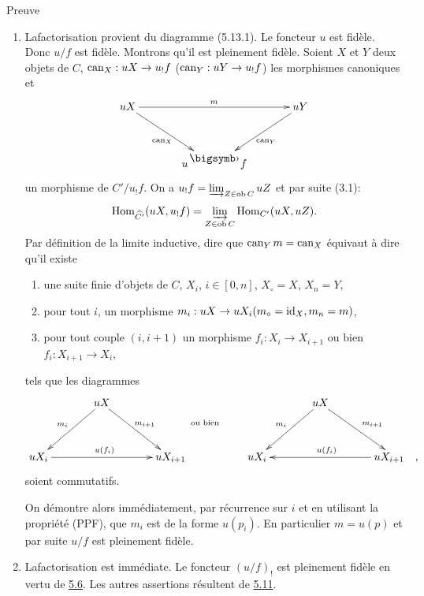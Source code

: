 \documentclass[10pt]{../fichiers-configuration-latex/smfart}
\def\labelenumi{(\theenumi)}
\def\labelenumii{(\theenumii)}
\begin{document}
\begin{enonce*}[remark]{Preuve}
\begin{enumerate}
\renewcommand{\labelenumi}{\theenumi)}
\item La\pageoriginale factorisation provient du diagramme
  (5.13.1). Le foncteur $u$ est fidèle. Donc $u/f$ est
  fidèle. Montrons qu'il est pleinement fidèle. Soient $X$ et $Y$
  deux objets de $C$, $\operatorname{can}_X:uX\rightarrow u_{!}f$
  (\resp  $\operatorname{can}_Y:uY\rightarrow u_{!}f$) les morphismes canoniques et
\[
\xymatrix@=1.25cm{
uX \ar[rr]^{m} \ar[rd]_{\can_X}&               & uY \ar[ld]^{\can_Y}\\
   & u^{\bigdot}f &
}
\]
un morphisme de $C'/u_{!}f$. On a $u_{!}f=\varinjlim_{Z\in
  \operatorname{ob} C} uZ$ et par suite (3.1):
$$
\operatorname{Hom}_{\widehat{C'}}(uX,u_{!}f)=\varinjlim_{Z\in
  \operatorname{ob} C}\operatorname{Hom}_{C'}(uX, uZ){}.
$$
Par définition de la limite inductive, dire que $\operatorname{can}_Y m=\operatorname{can}_X$
équivaut à dire qu'il existe
\begin{enumerate}
\renewcommand{\theenumii}{\alph{enumii}}
\renewcommand{\labelenumii}{\theenumii)}
\item une suite finie d'objets de $C$, $X_i$, $i\in [0,n]$,
  $X_\circ=X$, $X_n=Y$,

\item pour tout $i$, un morphisme $m_i:uX\rightarrow
  uX_i(m_\circ=\operatorname{id}_{X}, m_n=m)$,

\item pour tout couple $(i,i+1)$ un morphisme $f_i:X_i\rightarrow
  X_{i+1}$ ou bien $f_i:X_{i+1}\rightarrow X_i$,
\end{enumerate}
tels que les diagrammes
\begin{displaymath}
\xymatrix@R=1.25cm@C=1.25cm{
   &  uX \ar[rd]^{\;\;m_{i+1} \qquad\quad\text{ ou bien}} \ar[ld]_{m_i}&\\
  uX_i\ar[rr]^{u(f_i)} &          &  uX_{i+1}
}\qquad \xymatrix@R=1.25cm@C=1.25cm{
      &  uX \ar[rd]^{\;\;m_{i+1}} \ar[ld]_{m_i}&\\
 uX_i &                                        &
   uX_{i+1}\ar[ll]_{u(f_i)}\quad ,
}
\end{displaymath}
soient commutatifs.

On démontre alors immédiatement, par récurrence sur $i$ et en
utilisant la propriété (PPF), que $m_i$ est de la forme $u(p_i)$. En
particulier $m=u(p)$ et par suite $u/f$ est pleinement fidèle.

\item La\pageoriginale factorisation est immédiate. Le foncteur
  $(u/f)_{!}$ est pleinement fidèle en vertu de \hyperref[I.prop5.6]{5.6}. Les autres
  assertions résultent de \hyperref[I.prop5.11]{5.11}.


\end{enumerate}
\end{enonce*}
\end{document}
